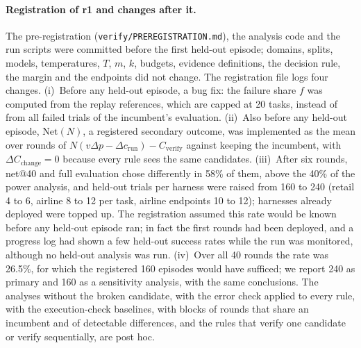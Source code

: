 \documentclass[11pt]{article}
\begin{document}
\paragraph{Registration of r1 and changes after it.} The pre-registration (\texttt{verify/PREREGISTRATION.md}), the analysis code and the run scripts were committed before the first held-out episode; domains, splits, models, temperatures, $T$, $m$, $k$, budgets, evidence definitions, the decision rule, the margin and the endpoints did not change. The registration file logs four changes. (i)~Before any held-out episode, a bug fix: the failure share $f$ was computed from the replay references, which are capped at 20 tasks, instead of from all failed trials of the incumbent's evaluation. (ii)~Also before any held-out episode, $\mathrm{Net}(N)$, a registered secondary outcome, was implemented as the mean over rounds of $N(v\Delta p-\Delta c_{\mathrm{run}})-C_{\mathrm{verify}}$ against keeping the incumbent, with $\Delta C_{\mathrm{change}}=0$ because every rule sees the same candidates. (iii)~After six rounds, net@40 and full evaluation chose differently in 58\% of them, above the 40\% of the power analysis, and held-out trials per harness were raised from 160 to 240 (retail 4 to 6, airline 8 to 12 per task, airline endpoints 10 to 12); harnesses already deployed were topped up. The registration assumed this rate would be known before any held-out episode ran; in fact the first rounds had been deployed, and a progress log had shown a few held-out success rates while the run was monitored, although no held-out analysis was run. (iv)~Over all 40 rounds the rate was 26.5\%, for which the registered 160 episodes would have sufficed; we report 240 as primary and 160 as a sensitivity analysis, with the same conclusions. The analyses without the broken candidate, with the error check applied to every rule, with the execution-check baselines, with blocks of rounds that share an incumbent and of detectable differences, and the rules that verify one candidate or verify sequentially, are post hoc.
\end{document}
